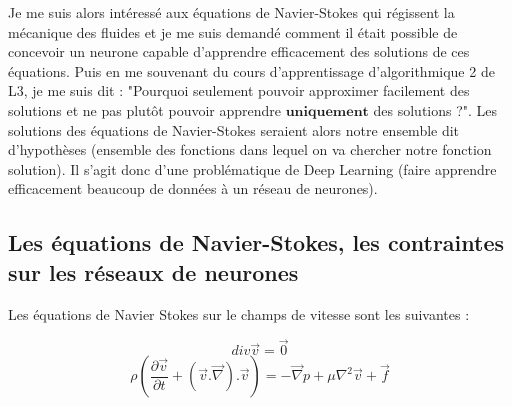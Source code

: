 \documentclass[10pt]{article}
\begin{document}
Je me suis alors intéressé aux équations de Navier-Stokes qui régissent la mécanique des fluides et je me suis demandé comment il était possible de concevoir un neurone capable d'apprendre efficacement des solutions de ces équations. Puis en me souvenant du cours d'apprentissage d'algorithmique 2 de L3, je me suis dit : "Pourquoi seulement pouvoir approximer facilement des solutions et ne pas plutôt pouvoir apprendre $\textbf{uniquement}$ des solutions ?". Les solutions des équations de Navier-Stokes seraient alors notre ensemble dit d'hypothèses (ensemble des fonctions dans lequel on va chercher notre fonction solution). Il s'agit donc d'une problématique de Deep Learning (faire apprendre efficacement beaucoup de données à un réseau de neurones).

\subsection{Les équations de Navier-Stokes, les contraintes sur les réseaux de neurones}
Les équations de Navier Stokes sur le champs de vitesse sont les suivantes : \cite{navier_stokes_equations}

\begin{equation}
div \overrightarrow{v} = \overrightarrow{0}
\end{equation}
\begin{equation}
\rho(\frac{\partial \overrightarrow{v}}{\partial t} + (\overrightarrow{v}.\overrightarrow{\nabla}). \overrightarrow{v}) = -\overrightarrow{\nabla} p + \mu \nabla^2\overrightarrow{v} +\overrightarrow{f}
\end{equation}
\end{document}
